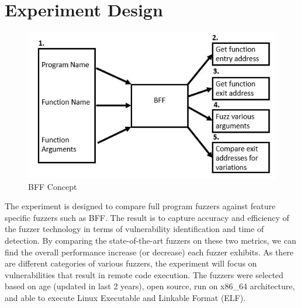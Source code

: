 \documentclass[conference]{IEEEtran}
\begin{document}
\section{Experiment Design}

\begin{figure}
  \includegraphics[width=\linewidth]{BFF_CONCEPT.JPG}
  \caption{BFF Concept}
  \label{fig:BFF_CONCEPT}
\end{figure}

The experiment is designed to compare full program fuzzers against feature specific fuzzers such as BFF. The result is to capture accuracy and efficiency of the fuzzer technology in terms of vulnerability identification and time of detection. By comparing the state-of-the-art fuzzers on these two metrics, we can find the overall performance increase (or decrease) each fuzzer exhibits. As there are different categories of various fuzzers, the experiment will focus on vulnerabilities that result in remote code execution. The fuzzers were selected based on age (updated in last 2 years), open source, run on x86\_64 architecture, and able to execute Linux Executable and Linkable Format (ELF).
\end{document}
